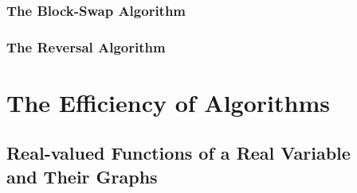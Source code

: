 \documentclass[12pt,openany]{book}
\theoremstyle{definition}
\begin{document}
	
	\subsection{The Block-Swap Algorithm}
	
	\subsection{The Reversal Algorithm}
	
	\newpage
	\chapter{The Efficiency of Algorithms}
	
	\section{Real-valued Functions of a Real Variable\\ and Their Graphs}
	
\end{document}
